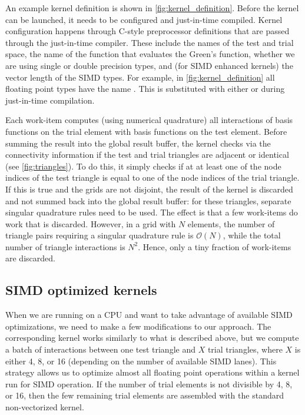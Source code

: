 An example kernel definition is shown in \cref{fig:kernel_definition}.
Before the kernel can be launched, it needs to be configured and just-in-time compiled. Kernel configuration happens through C-style preprocessor definitions that are passed through the just-in-time compiler. These include the names of the test and trial space, the name of the function that evaluates the Green's function, whether we are using single or double precision types, and (for SIMD enhanced kernels) the vector length of the SIMD types.
For example, in \cref{fig:kernel_definition} all floating point types have the name . This is substituted with either  or  during just-in-time compilation.

Each work-item computes (using numerical quadrature) all interactions of basis functions on the trial element with basis functions on the test element. Before summing the result into the global result buffer, the kernel checks via the connectivity information if the test and trial triangles are adjacent or identical (see \cref{fig:triangles}). To do this, it simply checks if at at least one of the node indices of the test triangle is equal to one of the node indices of the trial triangle. If this is true and the grids are not disjoint, the result of the kernel is discarded and not summed back into the global result buffer: for these triangles, separate singular quadrature rules need to be used. The effect is that a few work-items do work that is discarded. However, in a grid with $N$ elements, the number of triangle pairs requiring a singular quadrature rule is $\mathcal{O}(N)$, while the total number of triangle interactions is $N^2$. Hence, only a tiny fraction of work-items are discarded.

\subsection{SIMD optimized kernels}
When we are running on a CPU and want to take advantage of available SIMD optimizations, we need to make a few modifications to our approach. The corresponding kernel works similarly to what is described above, but we compute a batch of interactions between one test triangle and $X$ trial triangles, where $X$ is either 4, 8, or 16 (depending on the number of available SIMD lanes). This strategy allows us to optimize almost all floating point operations within a kernel run for SIMD operation. If the number of trial elements is not divisible by 4, 8, or 16, then the few remaining trial elements are assembled with the standard non-vectorized kernel.

